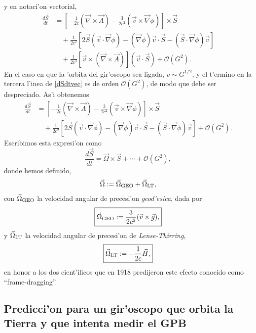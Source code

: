 y en notaci'on vectorial,
\begin{align}\label{dSdtvec}
\frac{d\vec{S}}{dt} &= \left[-\frac{1}{2c}(\vec{\nabla}\times\vec{A})-\frac{3}{2c^2}(\vec{v}\times\vec{\nabla}\phi)\right]\times\vec{S} \nonumber \\
 &\quad +\frac{1}{2c^2}\left[2\vec{S}(\vec{v}\cdot\vec{\nabla}\phi)-(\vec{\nabla}\phi)\vec{v}\cdot\vec{S}-(\vec{S}\cdot\vec\nabla\phi)\vec{v}\right] \nonumber\\
 &\quad + \frac{1}{2c^3}[\vec{v}\times(\vec{\nabla}\times\vec{A})](\vec{v}\cdot\vec{S})+\mathcal{O}(G^2).
\end{align}
En el caso en que la 'orbita del gir'oscopo sea ligada, $v\sim G^{1/2}$, y el t'ermino en la tercera l'inea de \eqref{dSdtvec} es de orden $\mathcal{O}(G^2)$, de modo que debe ser despreciado. As'i obtenemos
\begin{align}\label{dSdtvecfinal}
\frac{d\vec{S}}{dt} &= \left[-\frac{1}{2c}(\vec{\nabla}\times\vec{A})-\frac{3}{2c^2}(\vec{v}\times\vec{\nabla}\phi)\right]\times\vec{S} \nonumber \\
 &\quad +\frac{1}{2c^2}\left[2\vec{S}(\vec{v}\cdot\vec{\nabla}\phi)-(\vec{\nabla}\phi)\vec{v}\cdot\vec{S}-(\vec{S}\cdot\vec\nabla\phi)\vec{v}\right] +\mathcal{O}(G^2).
\end{align}
Escribimos esta expresi'on como
\begin{equation}
\frac{d\vec{S}}{dt}=\vec{\Omega}\times\vec{S}+\cdots + \mathcal{O}(G^2),
\end{equation}
donde hemos definido,
\begin{equation}
\vec{\Omega}:=\vec{\Omega}_{\rm GEO}+\vec{\Omega}_{\rm LT},
\end{equation}
con $\vec{\Omega}_{\rm GEO}$ la velocidad angular de precesi'on \emph{geod'esica}, dada por
\begin{align}\boxed{
\vec{\Omega}_{\rm GEO}:=\frac{3}{2c^2}(\vec{v}\times\vec{g}),}\label{geodetic}
\end{align}
y $\vec{\Omega}_{\rm LT}$ la velocidad angular de precesi'on de \emph{Lense-Thirring}, 
\begin{align}\boxed{
\vec{\Omega}_{\rm LT}:=-\frac{1}{2c}\vec{H},}\label{LT}
\end{align}
en honor a los dos cient'ificos que en 1918 predijeron este efecto conocido como ``frame-dragging''.


\subsection{Predicci'on para un gir'oscopo que orbita la Tierra y que intenta medir el GPB}

